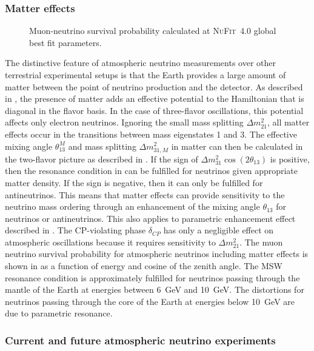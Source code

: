 \subsubsection{Matter effects}
\begin{figure}
    \centering
    
    \caption{Muon-neutrino survival probability calculated at \textsc{NuFit~4.0}\cite{nufit40} global best fit parameters.}
    \label{fig:three-flavor-oscprob}
\end{figure}
The distinctive feature of atmospheric neutrino measurements over other terrestrial experimental setups is that the Earth provides a large amount of matter between the point of neutrino production and the detector.
As described in , the presence of matter adds an effective potential to the Hamiltonian that is diagonal in the flavor basis.
In the case of three-flavor oscillations, this potential affects only electron neutrinos.
Ignoring the small mass splitting $\Delta m^2_{21}$, all matter effects occur in the transitions between mass eigenstates 1 and 3.
The effective mixing angle $\theta_{13}^M$ and mass splitting $\Delta m^2_{31,M}$ in matter can then be calculated in the two-flavor picture as described in .
If the sign of $\Delta m^2_{31}\cos(2\theta_{13})$ is positive, then the resonance condition in  can be fulfilled for neutrinos given appropriate matter density.
If the sign is negative, then it can only be fulfilled for antineutrinos.
This means that matter effects can provide sensitivity to the neutrino mass ordering through an enhancement of the mixing angle $\theta_{13}$ for neutrinos or antineutrinos.
This also applies to parametric enhancement effect described in .
The CP-violating phase $\delta_{CP}$ has only a negligible effect on atmospheric oscillations because it requires sensitivity to $\Delta m^2_{21}$.
The muon neutrino survival probability for atmospheric neutrinos including matter effects is shown in  as a function of energy and cosine of the zenith angle.
The MSW resonance condition is approximately fulfilled for neutrinos passing through the mantle of the Earth at energies between \SI{6}{\giga\electronvolt} and \SI{10}{\giga\electronvolt}.
The distortions for neutrinos passing through the core of the Earth at energies below \SI{10}{\giga\electronvolt} are due to parametric resonance.

\subsubsection{Current and future atmospheric neutrino experiments}

